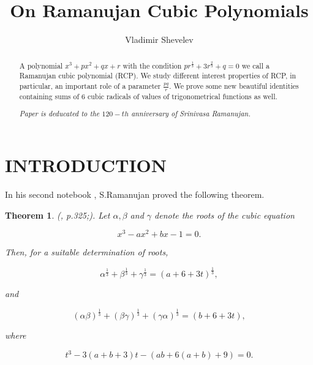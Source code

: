 \documentclass[12pt,oneside,english]{amsart}
\newtheorem{theorem}{Theorem}
\begin{document}
\baselineskip=17pt

\title{On Ramanujan Cubic Polynomials}

\author{Vladimir Shevelev}

\address{Departments of Mathematics \\Ben-Gurion University of the
 Negev\\Beer-Sheva 84105, Israel. e-mail:shevelev@bgu.ac.il}


\begin{abstract}
A polynomial $x^3+px^2+qx+r$ with the condition $pr^{\frac 1
3}+3r^{\frac 2 3}+q=0$ we call a Ramanujan cubic polynomial (RCP).
We study different interest properties of RCP, in particular, an
important role of a parameter $\frac{pq}{r}$. We prove some new
beautiful identities containing sums of 6 cubic radicals of values
of trigonometrical functions as well.


\slshape
Paper is deducated to the $120-th$ anniversary of Srinivasa
Ramanujan.\upshape
\end{abstract}

\maketitle
\section{INTRODUCTION }\label{s1}
     In his second notebook \cite{4}, S.Ramanujan proved the
following theorem.

\begin{theorem}\label{thm1}
(\cite{4}, p.325;\cite{2}). \slshape Let $\alpha,\beta$ and $\gamma$
denote the roots of the cubic equation\upshape

\begin{equation}\label{1}
x^3-ax^2+bx-1=0.
\end{equation}

\slshape Then, for a suitable determination of roots,\upshape

\begin{equation}\label{2}
\alpha^{\frac 1 3}+\beta^{\frac 1 3}+\gamma^{\frac 1
3}=(a+6+3t)^{\frac 1 3},
\end{equation}

\slshape and \upshape

\begin{equation}\label{3}
(\alpha\beta)^{\frac 1 3}+(\beta\gamma)^{\frac 1
3}+(\gamma\alpha)^{\frac 1 3}=(b+6+3t),
\end{equation}

\slshape where \upshape

\begin{equation}\label{4}
t^3-3(a+b+3)t-(ab+6(a+b)+9)=0.
\end{equation}
\end{theorem}
\end{document}
